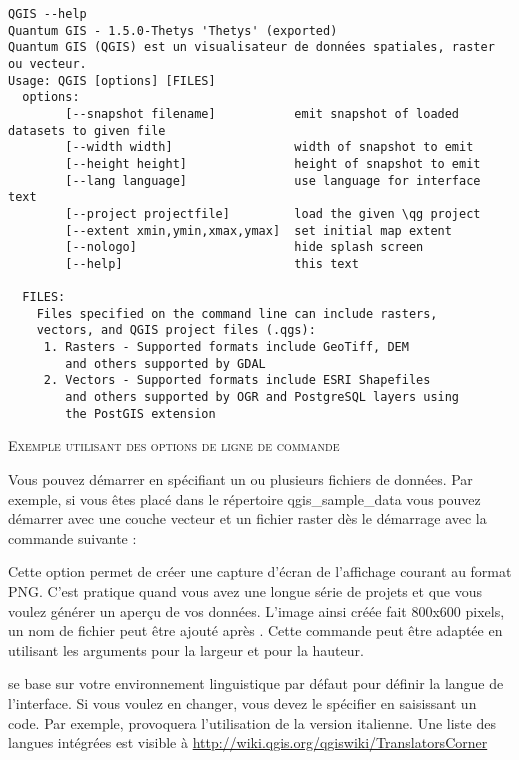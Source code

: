 \small
\begin{verbatim}
QGIS --help
Quantum GIS - 1.5.0-Thetys 'Thetys' (exported)
Quantum GIS (QGIS) est un visualisateur de données spatiales, raster ou vecteur.
Usage: QGIS [options] [FILES]
  options:
		[--snapshot filename]           emit snapshot of loaded datasets to given file
		[--width width]                 width of snapshot to emit
		[--height height]               height of snapshot to emit
		[--lang language]               use language for interface text
		[--project projectfile]         load the given \qg project
		[--extent xmin,ymin,xmax,ymax]  set initial map extent
		[--nologo]                      hide splash screen
		[--help]                        this text

  FILES:
    Files specified on the command line can include rasters,
    vectors, and QGIS project files (.qgs):
     1. Rasters - Supported formats include GeoTiff, DEM
        and others supported by GDAL
     2. Vectors - Supported formats include ESRI Shapefiles
        and others supported by OGR and PostgreSQL layers using
        the PostGIS extension
\end{verbatim}
\normalsize

\begin{Tip} \caption{\textsc{Exemple utilisant des options de ligne de commande}}
Vous pouvez démarrer \qg en spécifiant un ou plusieurs fichiers de données. Par exemple, si vous êtes placé dans le répertoire qgis\_sample\_data vous pouvez démarrer \qg avec une couche vecteur et un fichier raster dès le démarrage avec la commande suivante : 
\end{Tip}

Cette option permet de créer une capture d'écran de l'affichage courant au format PNG. C'est pratique quand vous avez une longue série de projets et que vous voulez générer un aperçu de vos données. L'image ainsi créée fait 800x600 pixels, un nom de fichier peut être ajouté après . Cette commande peut être adaptée en utilisant les arguments  pour la largeur et  pour la hauteur.

\qg se base sur votre environnement linguistique par défaut pour définir la langue de l'interface. Si vous voulez en changer, vous devez le spécifier en saisissant un code. 
Par exemple,  provoquera l'utilisation de la version italienne. Une liste des langues intégrées est visible à \url{http://wiki.qgis.org/qgiswiki/TranslatorsCorner}

